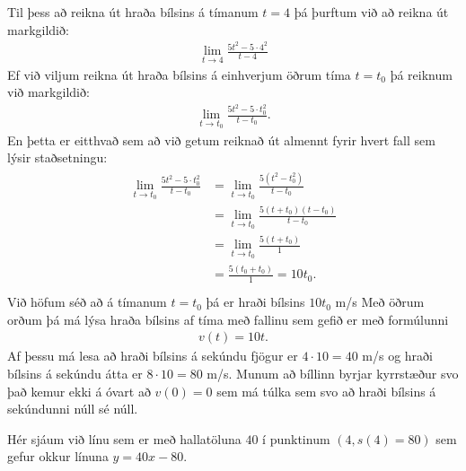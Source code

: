 \documentclass[a4paper,10pt,icelandic]{sphinxmanual}
\begin{document}
Til þess að reikna út hraða bílsins á tímanum \(t=4\) þá þurftum við að reikna út markgildið:
\begin{equation*}
\begin{split}\lim_{t\to 4}\frac{5t^2-5\cdot 4^2}{t-4}\end{split}
\end{equation*}
Ef við viljum reikna út hraða bílsins á einhverjum öðrum tíma \(t=t_0\) þá reiknum við markgildið:
\begin{equation*}
\begin{split}\lim_{t\to t_0}\frac{5t^2-5\cdot t_0^2}{t-t_0}.\end{split}
\end{equation*}
En þetta er eitthvað sem að við getum reiknað út almennt fyrir hvert fall sem lýsir staðsetningu:
\begin{equation*}
\begin{split}\begin{aligned}
\lim_{t\to t_0}\frac{5t^2-5\cdot t_0^2}{t-t_0} &=\lim_{t\to t_0}\frac{5(t^2-t_0^2)}{t-t_0} \\
&=\lim_{t\to t_0}\frac{5(t+t_0)(t-t_0)}{t-t_0}\\
&=\lim_{t\to t_0}\frac{5(t+t_0)}{1} \\
&=\frac{5(t_0+t_0)}{1}=10 t_0. \\
\end{aligned}\end{split}
\end{equation*}
Við höfum séð að á tímanum \(t=t_0\) þá er hraði bílsins \(10t_0\) m/s
Með öðrum orðum þá má lýsa hraða bílsins af tíma með fallinu sem gefið er með formúlunni
\begin{equation*}
\begin{split}v(t)=10t.\end{split}
\end{equation*}
Af þessu má lesa að hraði bílsins á sekúndu fjögur er \(4\cdot 10=40\) m/s og hraði bílsins á sekúndu átta er \(8\cdot 10=80\) m/s.
Munum að bíllinn byrjar kyrrstæður svo það kemur ekki á óvart að \(v(0)=0\) sem má túlka sem svo að hraði bílsins á sekúndunni núll sé núll.
\begin{quote}

\end{quote}

Hér sjáum við línu sem er með hallatöluna \(40\) í punktinum \((4, s(4) = 80)\) sem gefur okkur línuna \(y = 40x -80\).
\end{document}
